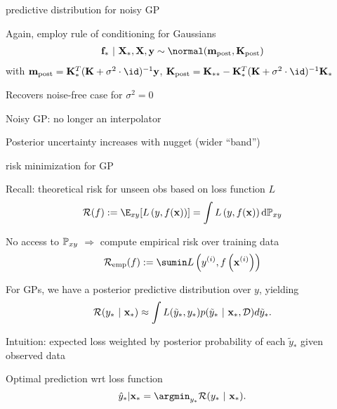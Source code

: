 \documentclass[11pt,compress,t,notes=noshow, xcolor=table]{beamer}
\begin{document}
\begin{framei}[sep=M]{predictive distribution for noisy GP}
\item Again, employ rule of conditioning for Gaussians 
\begin{eqnarray*}
\fv_* ~|~ \Xmat_*, \Xmat, \yv \sim \normal(\mv_{\text{post}}, \Kmat_\text{post})
\end{eqnarray*}
with 
$\mv_{\text{post}} = \Kmat_{*}^{T} (\Kmat+ \sigma^2 \cdot \id)^{-1}\yv$, 
$\Kmat_\text{post} = \Kmat_{**} - \Kmat_*^T (\Kmat  + \sigma^2 \cdot \id)^{-1}\Kmat_*$
\item Recovers noise-free case for $\sigma^2 = 0$
\item Noisy GP: no longer an interpolator 
\item Posterior uncertainty increases with nugget (wider ``band'')
\vfill
{}
\end{framei}

\begin{framei}[sep=M]{risk minimization for GP}
\item Recall: theoretical risk for unseen obs based on loss function $L$
$$\riskf := \E_{xy} [\Lxy] = \int \Lxy \text{d}\Pxy$$ 
\item No access to $\mathbb{P}_{xy}$ $\Rightarrow$ compute empirical risk over training data $$\riske(f) := \sumin \Lxyi$$ 
\item For GPs, we have a posterior predictive distribution over $y$, yielding
$$
    \mathcal{R}(y_* ~|~ \mathbf{x}_*) \approx \int L(\tilde y_*, y_*) p(\tilde y_*~|~\mathbf{x}_*, \mathcal{D})d\tilde y_*. 
  $$
\item Intuition: expected loss weighted by posterior probability of each $\tilde y_*$ given observed data
\item Optimal prediction wrt loss function
$$
    \yh_* | \xv_* = \argmin_{y_*} \mathcal{R}(y_*~|~ \xv_*).
  $$
\end{framei}





\end{document}
